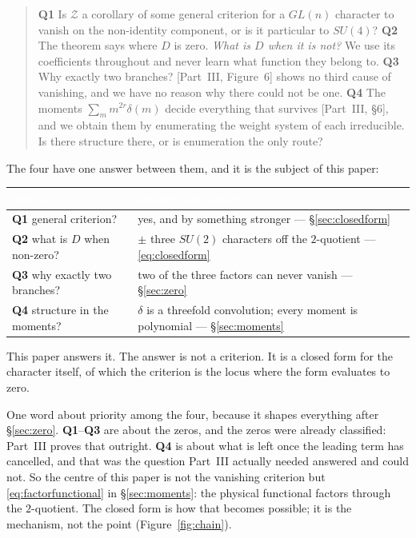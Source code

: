 \documentclass[11pt,a4paper]{article}
\newcommand{\su}[1]{SU(#1)}
\begin{document}
\begin{quote}
\textbf{Q1} Is $\mathcal Z$ a corollary of some general criterion for a $GL(n)$ character
to vanish on the non-identity component, or is it particular to $\su4$?\quad
\textbf{Q2} The theorem says where $D$ is zero. \emph{What is $D$ when it is not?} We use
its coefficients throughout and never learn what function they belong to.\quad
\textbf{Q3} Why exactly two branches? [Part~III, Figure~6] shows no third cause of
vanishing, and we have no reason why there could not be one.\quad
\textbf{Q4} The moments $\sum_m m^{2r}\delta(m)$ decide everything that survives
[Part~III, \S6], and we obtain them by enumerating the weight system of each irreducible.
Is there structure there, or is enumeration the only route?
\end{quote}

The four have one answer between them, and it is the subject of this paper:
\begin{center}\small
\begin{tabular}{ll}
\toprule
\rowcolor{hdrblue}\textcolor{white}{question} & \textcolor{white}{answer, and where}\\
\midrule
\textbf{Q1} general criterion? &
yes, and by something stronger --- \S\ref{sec:closedform}\\
\rowcolor{softgrey}
\textbf{Q2} what is $D$ when non-zero? &
$\pm$ three $SU(2)$ characters off the $2$-quotient --- \eqref{eq:closedform}\\
\textbf{Q3} why exactly two branches? &
two of the three factors can never vanish --- \S\ref{sec:zero}\\
\rowcolor{softgrey}
\textbf{Q4} structure in the moments? &
$\delta$ is a threefold convolution; every moment is polynomial --- \S\ref{sec:moments}\\
\bottomrule
\end{tabular}
\end{center}

This paper answers it. The answer is not a criterion. It is a closed form for the character
itself, of which the criterion is the locus where the form evaluates to zero.

One word about priority among the four, because it shapes everything after \S\ref{sec:zero}.
\textbf{Q1}--\textbf{Q3} are about the zeros, and the zeros were already classified: Part~III
proves that outright. \textbf{Q4} is about what is left once the leading term has cancelled,
and that was the question Part~III actually needed answered and could not. So the centre of
this paper is not the vanishing criterion but \eqref{eq:factorfunctional} in
\S\ref{sec:moments}: the physical functional factors through the $2$-quotient. The closed form
is how that becomes possible; it is the mechanism, not the point (Figure~\ref{fig:chain}).
\end{document}
